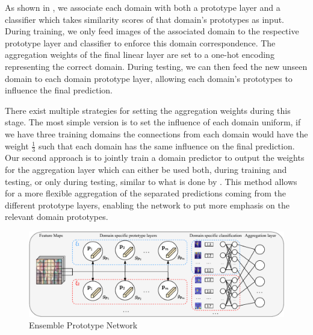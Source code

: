 As shown in , we associate each domain with both a prototype layer and a classifier which takes similarity scores of that domain's prototypes as input. During training, we only feed images of the associated domain to the respective prototype layer and classifier to enforce this domain correspondence. The aggregation weights of the final linear layer are set to a one-hot encoding representing the correct domain. During testing, we can then feed the new unseen domain to each domain prototype layer, allowing each domain's prototypes to influence the final prediction. 

There exist multiple strategies for setting the aggregation weights during this stage. The most simple version is to set the influence of each domain uniform, \ie if we have three training domains the connections from each domain would have the weight $\frac{1}{3}$ such that each domain has the same influence on the final prediction. Our second approach is to jointly train a domain predictor to output the weights for the aggregation layer which can either be used both, during training and testing, or only during testing, similar to what is done by \citet{ManciniBC018}. This method allows for a more flexible aggregation of the separated predictions coming from the different prototype layers, enabling the network to put more emphasis on the relevant domain prototypes.  

\begin{figure}[t]
    \centering
    \includegraphics[width=\textwidth]{Figures/Chapter4/prototype_ensemble-cropped.pdf}
    \caption{Ensemble Prototype Network}
    \label{fig:ensemble_prototype_network}
\end{figure}

